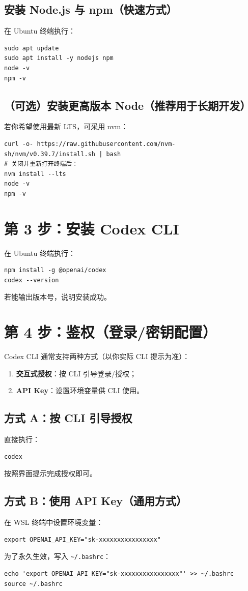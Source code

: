 \documentclass[11pt,a4paper]{article}
\begin{document}
\subsection{安装 Node.js 与 npm（快速方式）}
在 Ubuntu 终端执行：
\begin{lstlisting}
sudo apt update
sudo apt install -y nodejs npm
node -v
npm -v
\end{lstlisting}

\subsection{（可选）安装更高版本 Node（推荐用于长期开发）}
若你希望使用最新 LTS，可采用 nvm：
\begin{lstlisting}
curl -o- https://raw.githubusercontent.com/nvm-sh/nvm/v0.39.7/install.sh | bash
# 关闭并重新打开终端后：
nvm install --lts
node -v
npm -v
\end{lstlisting}

\section{第 3 步：安装 Codex CLI}
在 Ubuntu 终端执行：
\begin{lstlisting}
npm install -g @openai/codex
codex --version
\end{lstlisting}
若能输出版本号，说明安装成功。

\section{第 4 步：鉴权（登录/密钥配置）}
Codex CLI 通常支持两种方式（以你实际 CLI 提示为准）：
\begin{enumerate}[leftmargin=1.7em]
  \item \textbf{交互式授权}：按 CLI 引导登录/授权；
  \item \textbf{API Key}：设置环境变量供 CLI 使用。
\end{enumerate}

\subsection{方式 A：按 CLI 引导授权}
直接执行：
\begin{lstlisting}
codex
\end{lstlisting}
按照界面提示完成授权即可。

\subsection{方式 B：使用 API Key（通用方式）}
在 WSL 终端中设置环境变量：
\begin{lstlisting}
export OPENAI_API_KEY="sk-xxxxxxxxxxxxxxxx"
\end{lstlisting}
为了永久生效，写入 \texttt{\textasciitilde/.bashrc}：
\begin{lstlisting}
echo 'export OPENAI_API_KEY="sk-xxxxxxxxxxxxxxxx"' >> ~/.bashrc
source ~/.bashrc
\end{lstlisting}
\end{document}
